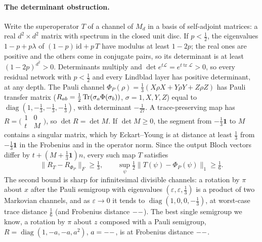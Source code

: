\paragraph{The determinant obstruction.} Write the superoperator $T$ of a channel of $M_d$ in a basis of
self-adjoint matrices: a real $d^2\times d^2$ matrix with spectrum in the closed unit disc. If $p<\tfrac12$, the
eigenvalues $1-p+p\lambda$ of $(1-p)\,\mathrm{id}+p\,T$ have modulus at least $1-2p$; the real ones are positive and
the others come in conjugate pairs, so its determinant is at least $(1-2p)^{d^2}>0$. Determinants multiply and
$\det e^{t\mathcal L}=e^{t\operatorname{tr}\mathcal L}>0$, so every residual network with $p<\tfrac12$ and every
Lindblad layer has positive determinant, at any depth. The Pauli channel
$\Phi_P(\rho)=\tfrac13(X\rho X+Y\rho Y+Z\rho Z)$ has Pauli transfer matrix ($R_{ab}=\tfrac12\operatorname{Tr}(\sigma_a\Phi(\sigma_b))$,
$\sigma=1,X,Y,Z$) equal to $\operatorname{diag}(1,-\tfrac13,-\tfrac13,-\tfrac13)$, with determinant $-\tfrac1{27}$.
A trace-preserving map has $R=\bigl(\begin{smallmatrix}1&0\\t&M\end{smallmatrix}\bigr)$, so $\det R=\det M$. If
$\det M\ge0$, the segment from $-\tfrac13\mathbf 1$ to $M$ contains a singular matrix, which by Eckart--Young is at
distance at least $\tfrac13$ from $-\tfrac13\mathbf 1$ in the Frobenius and in the operator norm. Since the output
Bloch vectors differ by $t+(M+\tfrac13\mathbf 1)n$, every such map $T$ satisfies
\begin{equation}\label{eq:det-floor}
\|R_T-R_{\Phi_P}\|_F\ge\tfrac13,\qquad\sup_\psi\tfrac12\bigl\|T(\psi)-\Phi_P(\psi)\bigr\|_1\ge\tfrac16 .
\end{equation}
The second bound is sharp for infinitesimal divisible channels: a rotation by $\pi$ about $x$ after the Pauli semigroup
with eigenvalues $(\varepsilon,\varepsilon,\tfrac13)$ is a product of two Markovian channels, and as
$\varepsilon\to0$ it tends to $\operatorname{diag}(1,0,0,-\tfrac13)$, at worst-case trace distance $\tfrac16$ (and
Frobenius distance $--$). The best single semigroup we know, a rotation by $\pi$ about $z$ composed with
a Pauli semigroup, $R=\operatorname{diag}(1,-a,-a,a^2)$, $a=--$, is at Frobenius distance $--$.

